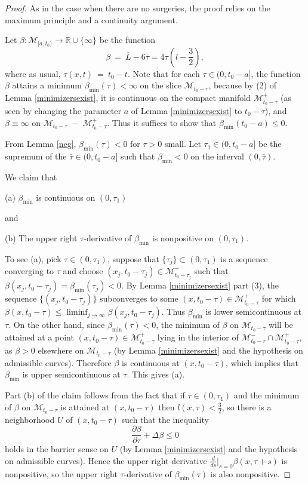 \documentclass[12pt]{amsart}
\newcommand{\be}{\beta}
\newcommand{\D}{\partial}
\newcommand{\De}{\Delta}
\newcommand{\M}{{\mathcal M}}
\newcommand{\R}{{\mathbb R}}
\newcommand{\ra}{\rightarrow}
\numberwithin{equation}{section}
\theoremstyle{plain}
\theoremstyle{definition}
\theoremstyle{remark}
\begin{document}
\begin{proof}
As in the case when there are no surgeries,
the proof relies on the maximum principle and a continuity argument.

Let $\be:\M_{[a,t_0)}\ra \R\cup \{\infty\}$ be the function
\begin{equation}
\be \: = \: \bar L-6\tau=4\tau\left(l-\frac{3}{2}\right),
\end{equation}
where as usual, $\tau(x,t) \: = \: t_0 - t$. 
Note that for each $\tau\in (0,t_0-a]$, the function
$\be$ attains a minimum $\be_{\min}(\tau)<\infty$ on the 
slice $\M_{t_0 - \tau}$,  because by (2) of Lemma \ref{minimizersexist},
it is continuous on the compact manifold 
$\M_{t_0 - \tau}^+$ (as seen by changing the parameter $a$ of 
Lemma \ref{minimizersexist} to $t_0 - \tau$),
and $\be\equiv\infty$ on 
$\M_{t_0 - \tau}\;-\;\M_{t_0 - \tau}^+$.
Thus it suffices to show that $\be_{\min}(t_0-a)\leq 0$.

From Lemma \ref{neg}, $\beta_{\min}(\tau)<0$  for $\tau>0$ small.
Let $\tau_1\in (0,t_0-a]$ be the supremum of the 
$\bar \tau\in(0,t_0-a]$ such that $\be_{\min}< 0$ on the interval $(0,\bar\tau)$.
 
We claim that 

(a) $\be_{\min}$ is continuous on $(0,\tau_1)$

and

(b) The upper right $\tau$-derivative of $\be_{\min}$ is nonpositive
on $(0,\tau_1)$.

To see (a), pick $\tau\in (0,\tau_1)$, suppose 
that $\{\tau_j\}\subset (0,\tau_1)$ is a sequence
converging to $\tau$ and choose $(x_j,t_0 - \tau_j)\in \M_{t_0 - \tau_j}^+$
such that $\be(x_j,t_0 - \tau_j)=\be_{\min}(\tau_j)< 0$.  
By Lemma \ref{minimizersexist}
part (3), the sequence $\{(x_j,t_0 - \tau_j)\}$ subconverges to some
$(x,t_0 - \tau)\in\M_{t_0 - \tau}^+$
for which $\be(x,t_0 - \tau)\leq \liminf_{j\ra\infty}\be(x_j,t_0 - \tau_j)$.
Thus 
$\be_{\min}$ is lower semicontinuous at $\tau$.  On the other hand,
since $\be_{\min}(\tau)< 0$, the minimum of $\be$ on $\M_{t_0 - \tau}$
will be attained at a point
$(x,t_0 - \tau)\in \M_{t_0 - \tau}^+$ lying 
in the interior of $\M_{t_0 - \tau}^-\cap \M_{t_0 - \tau}^+$,
as $\be>0$ elsewhere on $\M_{t_0 - \tau}$ 
(by Lemma \ref{minimizersexist} and the
hypothesis on admissible curves).  Therefore $\be$ is continuous at 
$(x,{t_0 - \tau})$,
which implies that $\be_{\min}$ is upper semicontinuous at $\tau$. 
This gives (a).

Part (b) of the claim follows from the fact that if $\tau\in (0,\tau_1)$ and
the minimum of $\be$ on $\M_{t_0 - \tau}$ is attained at
$(x,t_0 - \tau)$ then $l(x,\tau)< \frac32$, so there is a neighborhood $U$
of $(x,{t_0 - \tau})$ such that the inequality 
\begin{equation}
\frac{\D \be}{\D \tau}+\De \be \leq 0
\end{equation} 
holds in the barrier sense on $U$ (by Lemma \ref{minimizersexist} and the hypothesis
on admissible curves).
Hence the upper right derivative $\frac{d}{ds} \Big|_{s=0} \beta(x, \tau+s)$ is
nonpositive, so the upper right $\tau$-derivative of 
$\beta_{\min}(\tau)$ is also nonpositive.



\end{proof}
\end{document}
